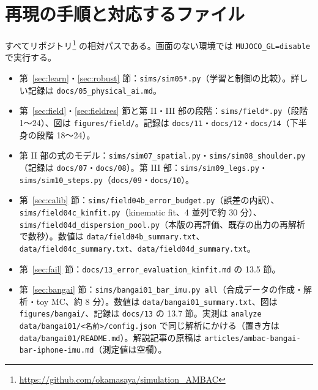 \documentclass[paper=a4paper,fontsize=10pt,twocolumn,column_gap=2zw,line_length=24zw,number_of_lines=46,head_space=20mm]{jlreq}
\newcommand{\repo}{https://github.com/okamasaya/simulation_AMBAC}
\begin{document}
\section{再現の手順と対応するファイル}
\small
すべてリポジトリ\footnote{\url{\repo}} の相対パスである。画面のない環境では \texttt{MUJOCO\_GL=disable} で実行する。
\begin{itemize}\setlength{\itemsep}{0pt}
\item 第~\ref{sec:learn}・\ref{sec:robust} 節：\texttt{sims/sim05*.py}（学習と制御の比較）。詳しい記録は \texttt{docs/05\_physical\_ai.md}。
\item 第~\ref{sec:field}・\ref{sec:fieldres} 節と第 II・III 部の段階：\texttt{sims/field*.py}（段階 1〜24）、図は \texttt{figures/field/}。記録は \texttt{docs/11}・\texttt{docs/12}・\texttt{docs/14}（下半身の段階 18〜24）。
\item 第 II 部の式のモデル：\texttt{sims/sim07\_spatial.py}・\texttt{sims/sim08\_shoulder.py}（記録は \texttt{docs/07}・\texttt{docs/08}）。第 III 部：\texttt{sims/sim09\_legs.py}・\texttt{sims/sim10\_steps.py}（\texttt{docs/09}・\texttt{docs/10}）。
\item 第~\ref{sec:calib} 節：\texttt{sims/field04b\_error\_budget.py}（誤差の内訳）、\texttt{sims/field04c\_kinfit.py}（kinematic fit、4 並列で約 30 分）、
\texttt{sims/field04d\_dispersion\_pool.py}（本版の再評価、既存の出力の再解析で数秒）。数値は \texttt{data/field04b\_summary.txt}、\texttt{data/field04c\_summary.txt}、\texttt{data/field04d\_summary.txt}。
\item 第~\ref{sec:fail} 節：\texttt{docs/13\_error\_evaluation\_kinfit.md} の 13.5 節。
\item 第~\ref{sec:bangai} 節：\texttt{sims/bangai01\_bar\_imu.py all}（合成データの作成・解析・toy MC、約 8 分）。数値は \texttt{data/bangai01\_summary.txt}、図は \texttt{figures/bangai/}、記録は \texttt{docs/13} の 13.7 節。実測は \texttt{analyze data/bangai01/<名前>/config.json} で同じ解析にかける（置き方は \texttt{data/bangai01/README.md}）。解説記事の原稿は \texttt{articles/ambac-bangai-bar-iphone-imu.md}（測定値は空欄）。
\end{itemize}
\end{document}

